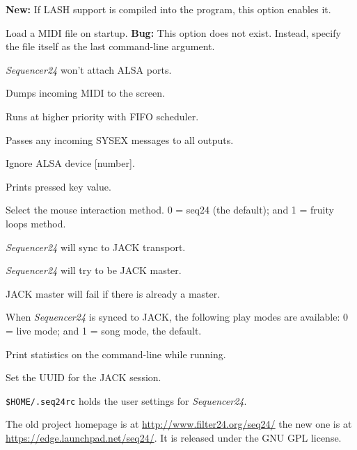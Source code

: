       \textbf{New:}
      If LASH support is compiled into the program, this option
      enables it.

      Load a MIDI file on startup.
      \textbf{Bug:}
      This option does not exist.
      Instead, specify the file itself as the last command-line argument.

      \textsl{Sequencer24} won't attach ALSA ports.

      Dumps incoming MIDI to the screen.

      Runs at higher priority with FIFO scheduler.

      Passes any incoming SYSEX messages to all outputs.

      Ignore ALSA device [number].

      Prints pressed key value.

      Select the mouse interaction method.
      0 = seq24 (the default); and 1 = fruity loops method.

      \textsl{Sequencer24} will sync to JACK transport.

      \textsl{Sequencer24} will try to be JACK master.

      JACK master will fail if there is already a master.

      When \textsl{Sequencer24} is synced to JACK, the following play modes
      are available: 0 = live mode; and 1 = song mode, the default.

      Print statistics on the command-line while running.

      Set the UUID for the JACK session.

   \texttt{\$HOME/.seq24rc} holds the user settings for \textsl{Sequencer24}.

   The old project homepage is at
   \url{http://www.filter24.org/seq24/} the new
   one is at \url{https://edge.launchpad.net/seq24/}.
   It is released under the GNU GPL license.

